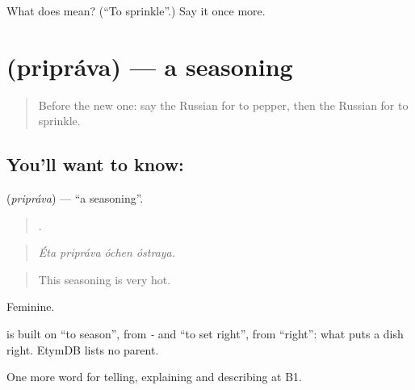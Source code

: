 \begin{tcolorbox}[breakable,colback=teal!4,colframe=teal!35!black,title={Before you move on}]
What does  mean? (\textquotedblleft{}To sprinkle\textquotedblright{}.) Say it once more.
\end{tcolorbox}
\section[\texorpdfstring{\ru{приправа} (pripráva)}{приправа (pripráva)}]{ (pripráva) — a seasoning}

\label{lesson:RU-C333-priprava}



\begin{quote}
Before the new one: say the Russian for to pepper, then the Russian for to sprinkle.
\end{quote}

\subsection*{You'll want to know: }
\textbf{} (\emph{pripráva}) — \textquotedblleft{}a seasoning\textquotedblright{}.

\begin{quote}
   .
\end{quote}

\begin{quote}
\emph{Éta pripráva óchen óstraya.}
\end{quote}

\begin{quote}
This seasoning is very hot.
\end{quote}

Feminine.

\begin{cousinweb}
\emph{} is built on \emph{} \textquotedblleft{}to season\textquotedblright{}, from \emph{-} and \emph{} \textquotedblleft{}to set right\textquotedblright{}, from \emph{} \textquotedblleft{}right\textquotedblright{}: what puts a dish right. EtymDB lists no parent.
\end{cousinweb}

\begin{grammarlens}[title={What you've built}]
One more word for telling, explaining and describing at B1.
\end{grammarlens}

